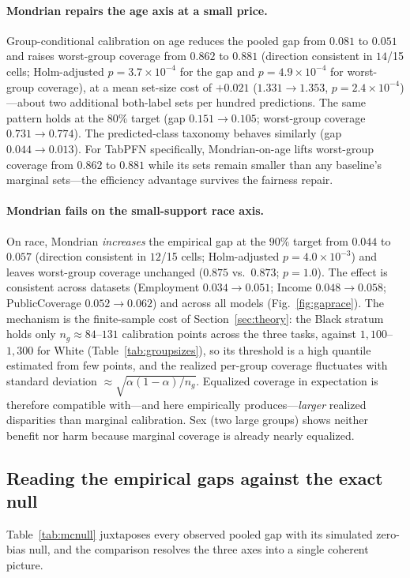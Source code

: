 \documentclass[review,12pt]{elsarticle}
\begin{document}
\paragraph{Mondrian repairs the age axis at a small price.}
Group-conditional calibration on age reduces the pooled gap from $0.081$ to $0.051$ and raises worst-group coverage from $0.862$ to $0.881$ (direction consistent in $14$/15 cells; Holm-adjusted $p=3.7\times10^{-4}$ for the gap and $p=4.9\times10^{-4}$ for worst-group coverage), at a mean set-size cost of $+0.021$ ($1.331 \to 1.353$, $p=2.4\times10^{-4}$)---about two additional both-label sets per hundred predictions. The same pattern holds at the $80\%$ target (gap $0.151 \to 0.105$; worst-group coverage $0.731 \to 0.774$). The predicted-class taxonomy behaves similarly (gap $0.044 \to 0.013$). For TabPFN specifically, Mondrian-on-age lifts worst-group coverage from $0.862$ to $0.881$ while its sets remain smaller than any baseline's marginal sets---the efficiency advantage survives the fairness repair.

\paragraph{Mondrian fails on the small-support race axis.}
On race, Mondrian \emph{increases} the empirical gap at the $90\%$ target from $0.044$ to $0.057$ (direction consistent in $12$/15 cells; Holm-adjusted $p=4.0\times10^{-3}$) and leaves worst-group coverage unchanged ($0.875$ vs.\ $0.873$; $p=1.0$). The effect is consistent across datasets (Employment $0.034 \to 0.051$; Income $0.048 \to 0.058$; PublicCoverage $0.052 \to 0.062$) and across all models (Fig.~\ref{fig:gaprace}). The mechanism is the finite-sample cost of Section~\ref{sec:theory}: the Black stratum holds only $n_g \approx 84$--$131$ calibration points across the three tasks, against $1{,}100$--$1{,}300$ for White (Table~\ref{tab:groupsizes}), so its threshold is a high quantile estimated from few points, and the realized per-group coverage fluctuates with standard deviation $\approx \sqrt{\alpha(1-\alpha)/n_g}$. Equalized coverage in expectation is therefore compatible with---and here empirically produces---\emph{larger} realized disparities than marginal calibration. Sex (two large groups) shows neither benefit nor harm because marginal coverage is already nearly equalized.

\subsection{Reading the empirical gaps against the exact null}
\label{sec:nullread}
Table~\ref{tab:mcnull} juxtaposes every observed pooled gap with its simulated zero-bias null, and the comparison resolves the three axes into a single coherent picture.
\end{document}
